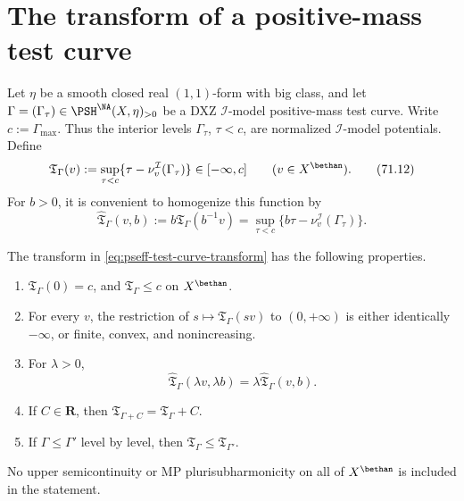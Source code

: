 \section{The transform of a positive-mass test curve}

Let \(\eta\) be a smooth closed real \((1,1)\)-form with big class, and
let
\(\Gamma=(\Gamma_\tau)\in\PSH^{\NA}(X,\eta)_{>0}\) be a DXZ
\(\mathcal I\)-model positive-mass test curve.  Write
\(c:=\Gamma_{\max}\).  Thus the interior levels
\(\Gamma_\tau\), \(\tau<c\), are normalized
\(\mathcal I\)-model potentials.  Define
\[
 \mathfrak T_\Gamma(v)
 :=\sup_{\tau<c}
       \{\tau-\nu_v^{\mathcal I}(\Gamma_\tau)\}
 \in[-\infty,c]
 \qquad (v\in X^{\bethan}).
\tag{71.12}\label{eq:pseff-test-curve-transform}
\]
For \(b>0\), it is convenient to homogenize this function by
\[
 \widehat{\mathfrak T}_\Gamma(v,b)
 :=b\mathfrak T_\Gamma(b^{-1}v)
 =\sup_{\tau<c}
       \{b\tau-\nu_v^{\mathcal I}(\Gamma_\tau)\}.
\tag{71.13}\label{eq:pseff-homogeneous-transform}
\]

\begin{proposition}\label{prop:pseff-one-curve-transform}
The transform in \eqref{eq:pseff-test-curve-transform} has the following
properties.
\begin{enumerate}
\item \(\mathfrak T_\Gamma(0)=c\), and
      \(\mathfrak T_\Gamma\leq c\) on \(X^{\bethan}\).
\item For every \(v\), the restriction of
      \(s\mapsto\mathfrak T_\Gamma(sv)\) to \((0,+\infty)\) is either
      identically \(-\infty\), or finite, convex, and nonincreasing.
\item For \(\lambda>0\),
      \[
       \widehat{\mathfrak T}_\Gamma(\lambda v,\lambda b)
       =\lambda\widehat{\mathfrak T}_\Gamma(v,b).
      \tag{71.14}\label{eq:pseff-joint-homogeneity}
      \]
\item If \(C\in\mathbf R\), then
      \(\mathfrak T_{\Gamma+C}=\mathfrak T_\Gamma+C\).
\item If \(\Gamma\leq\Gamma'\) level by level, then
      \(\mathfrak T_\Gamma\leq\mathfrak T_{\Gamma'}\).
\end{enumerate}
No upper semicontinuity or MP plurisubharmonicity on all of
\(X^{\bethan}\) is included in the statement.
\end{proposition}

